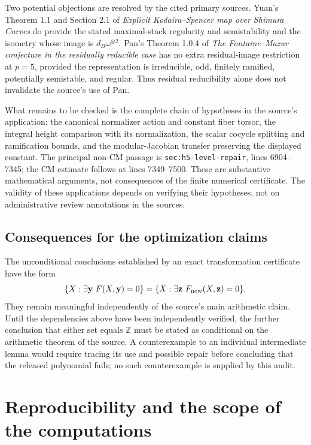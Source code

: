 \documentclass[11pt]{article}
\theoremstyle{definition}
\begin{document}
Two potential objections are resolved by the cited primary sources.  Yuan's Theorem 1.1 and Section 2.1
of \emph{Explicit Kodaira--Spencer map over Shimura Curves}
\cite[Theorem 1.1 and Section 2.1]{Yuan2024} do provide the stated maximal-stack
regularity and semistability and the isometry whose image is
$d_B\omega^{\otimes2}$.  Pan's Theorem 1.0.4 of
\emph{The Fontaine--Mazur conjecture in the residually reducible case}
\cite[Theorem 1.0.4]{Pan2022} has no extra residual-image restriction
at $p=5$, provided the representation is irreducible, odd, finitely
ramified, potentially semistable, and regular.  Thus residual
reducibility alone does not invalidate the source's use of Pan.

What remains to be checked is the complete chain of hypotheses in the
source's application: the canonical normalizer action and constant
fiber torsor, the integral height comparison with its normalization,
the scalar cocycle splitting and ramification bounds, and the
modular-Jacobian transfer preserving the displayed constant.
The principal non-CM passage is
\texttt{sec:h5-level-repair}, lines 6904--7345; the CM estimate follows
at lines 7349--7500.  These are substantive mathematical arguments,
not consequences of the finite numerical certificate.  The validity of these applications depends on verifying their
hypotheses, not on administrative review annotations in the sources.

\subsection{Consequences for the optimization claims}

The unconditional conclusions established by an exact transformation
certificate have the form
\[
 \{X:\exists\mathbf y\ F(X,\mathbf y)=0\}
 =\{X:\exists\mathbf z\ F_{\rm new}(X,\mathbf z)=0\}.
\]
They remain meaningful independently of the source's main arithmetic
claim.  Until the dependencies above have been independently verified,
the further conclusion that either set equals $\mathbb Z$ must be
stated as conditional on the arithmetic theorem of the source.
A counterexample to an individual intermediate lemma would require
tracing its use and possible repair before concluding that the released
polynomial fails; no such counterexample is supplied by this audit.


\section{Reproducibility and the scope of the computations}
\label{sec:reproducibility}
\end{document}
